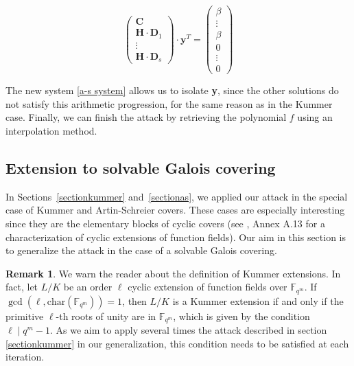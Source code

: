 \documentclass[10pt]{article}
\theoremstyle{definition}
\newtheorem{rq1}[thm]{Remark}
\theoremstyle{definition}
\theoremstyle{definition}
\newcommand{\cd}{\cdot}
\newcommand{\Fqm}{\mathbb{F}_{q^m}}
\begin{document}
\begin{equation} \label{a-s system}
\begin{pmatrix}
\mathbf{C}\\
\mathbf{H} \cd \mathbf{D}_1 \\
\vdots \\
\mathbf{H} \cd \mathbf{D}_s
\end{pmatrix}
\cd \mathbf{y}^T = 
\begin{pmatrix}
\beta \\
\vdots \\
\beta \\
0 \\
\vdots \\
0
\end{pmatrix} 
\end{equation}

The new system \eqref{a-s system} allows us to isolate \textbf{y}, since the other solutions do not satisfy this arithmetic progression, for the same reason as in the Kummer case. Finally, we can finish the attack by retrieving the polynomial $f$ using an interpolation method. 

\subsection{Extension to solvable Galois covering} \label{solvable}

In Sections~\ref{sectionkummer} and~\ref{sectionas}, we applied our attack in the special case of Kummer and Artin-Schreier covers. These cases are especially interesting since they are the elementary blocks of cyclic covers (see \cite{Sti}, Annex A.13 for a characterization of cyclic extensions of function fields). Our aim in this section is to generalize the attack in the case of a solvable Galois covering.

\begin{rq1} \label{racinesdel'unite}
We warn the reader about the definition of Kummer extensions. In fact, let $L/K$ be an order $\ell$ cyclic extension of function fields over $\Fqm$. If $\gcd(\ell,\mathrm{char}(\Fqm))=1$, then $L/K$ is a Kummer extension if and only if the primitive $\ell$-th roots of unity are in $\Fqm$, which is given by the condition $\ell \mid q^m-1$. As we aim to apply several times the attack described in section \ref{sectionkummer} in our generalization, this condition needs to be satisfied at each iteration.
\end{rq1}
\end{document}
